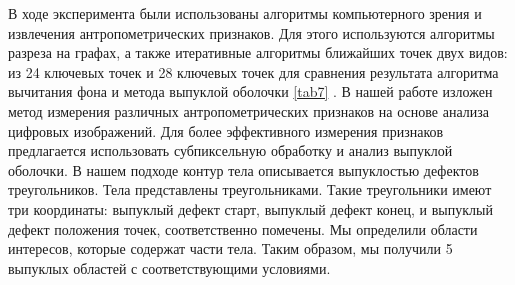 В ходе эксперимента были использованы алгоритмы компьютерного зрения и извлечения антропометрических признаков. Для этого используются алгоритмы разреза на графах, а также итеративные алгоритмы ближайших точек двух видов: из 24 ключевых точек и 28 ключевых точек для сравнения результата алгоритма вычитания фона и метода выпуклой оболочки \ref{tab7} . В нашей работе \cite{long1} изложен метод измерения различных антропометрических признаков на основе анализа цифровых изображений. Для более эффективного измерения признаков предлагается использовать субпиксельную обработку и анализ выпуклой оболочки. В нашем подходе контур тела описывается выпуклостью дефектов треугольников. Тела представлены треугольниками. Такие треугольники имеют три координаты: выпуклый дефект старт, выпуклый дефект конец, и выпуклый дефект положения точек, соответственно помечены. Мы определили области интересов, которые содержат части тела. Таким образом, мы получили 5 выпуклых областей с соответствующими условиями.


